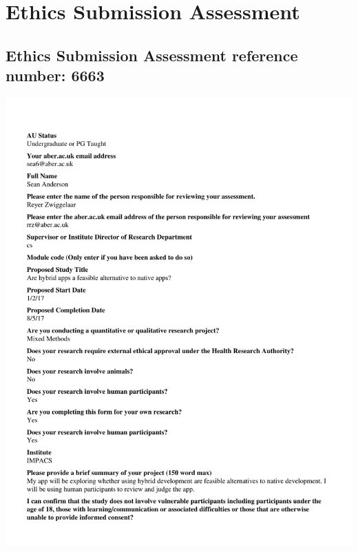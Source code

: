 \chapter{Ethics Submission Assessment}
\section{Ethics Submission Assessment reference number: 6663}
\includegraphics[scale=0.6]{6663.pdf}